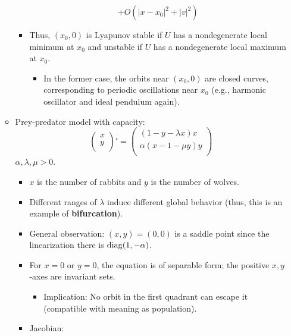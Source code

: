 \documentclass[../notes.tex]{subfiles}
\begin{document}
\begin{itemize}
\begin{itemize}
\begin{itemize}
\begin{equation*}
                +O(|x-x_0|^2+|v|^2)
            \end{equation*}
            \item Thus, $(x_0,0)$ is Lyapunov stable if $U$ has a nondegenerate local minimum at $x_0$ and unstable if $U$ has a nondegenerate local maximum at $x_0$.
            \begin{itemize}
                \item In the former case, the orbits near $(x_0,0)$ are closed curves, corresponding to periodic oscillations near $x_0$ (e.g., harmonic oscillator and ideal pendulum again).
            \end{itemize}
        \end{itemize}
        \item Prey-predator model with capacity:
        \begin{equation*}
            \begin{pmatrix}
                x\\
                y\\
            \end{pmatrix}'
            =
            \begin{pmatrix}
                (1-y-\lambda x)x\\
                \alpha(x-1-\mu y)y\\
            \end{pmatrix}
        \end{equation*}
        $\alpha,\lambda,\mu>0$.
        \begin{itemize}
            \item $x$ is the number of rabbits and $y$ is the number of wolves.
            \item Different ranges of $\lambda$ induce different global behavior (thus, this is an example of \textbf{bifurcation}).
            \item General observation: $(x,y)=(0,0)$ is a saddle point since the linearization there is $\operatorname{diag}(1,-\alpha)$.
            \item For $x=0$ or $y=0$, the equation is of separable form; the positive $x,y$-axes are invariant sets.
            \begin{itemize}
                \item Implication: No orbit in the first quadrant can escape it (compatible with meaning as population).
            \end{itemize}
            \item Jacobian:
            \begin{equation*}

\end{equation*}
\end{itemize}
\end{itemize}
\end{itemize}
\end{document}
